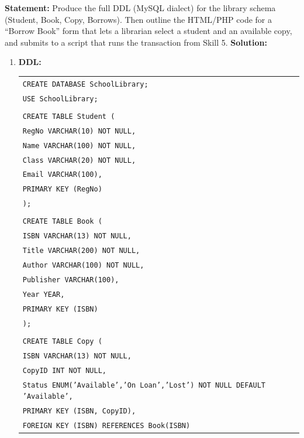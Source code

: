 \documentclass[11pt]{article}
\begin{document}
\begin{exoresolu}
\textbf{Statement:} Produce the full DDL (MySQL dialect) for the library schema (Student, Book, Copy, Borrows). Then outline the HTML/PHP code for a “Borrow Book” form that lets a librarian select a student and an available copy, and submits to a script that runs the transaction from Skill 5.
\tcblower
\textbf{Solution:}
\begin{enumerate}
\item \textbf{DDL:}
\begin{center}
\begin{tabular}{|l|}
\hline
\texttt{CREATE DATABASE SchoolLibrary;} \\
\texttt{USE SchoolLibrary;} \\
\texttt{} \\
\texttt{CREATE TABLE Student (} \\
\texttt{\quad RegNo VARCHAR(10) NOT NULL,} \\
\texttt{\quad Name VARCHAR(100) NOT NULL,} \\
\texttt{\quad Class VARCHAR(20) NOT NULL,} \\
\texttt{\quad Email VARCHAR(100),} \\
\texttt{\quad PRIMARY KEY (RegNo)} \\
\texttt{);} \\
\texttt{} \\
\texttt{CREATE TABLE Book (} \\
\texttt{\quad ISBN VARCHAR(13) NOT NULL,} \\
\texttt{\quad Title VARCHAR(200) NOT NULL,} \\
\texttt{\quad Author VARCHAR(100) NOT NULL,} \\
\texttt{\quad Publisher VARCHAR(100),} \\
\texttt{\quad Year YEAR,} \\
\texttt{\quad PRIMARY KEY (ISBN)} \\
\texttt{);} \\
\texttt{} \\
\texttt{CREATE TABLE Copy (} \\
\texttt{\quad ISBN VARCHAR(13) NOT NULL,} \\
\texttt{\quad CopyID INT NOT NULL,} \\
\texttt{\quad Status ENUM('Available','On Loan','Lost') NOT NULL DEFAULT 'Available',} \\
\texttt{\quad PRIMARY KEY (ISBN, CopyID),} \\
\texttt{\quad FOREIGN KEY (ISBN) REFERENCES Book(ISBN)} \\

\end{tabular}
\end{center}
\end{enumerate}
\end{exoresolu}
\end{document}
